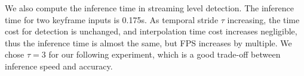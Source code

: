 \documentclass[a4paper, 10pt, conference]{ieeeconf}      %
\begin{document}
We also compute the inference time in streaming level detection. The inference time for two keyframe inputs is 0.175s. As temporal stride $\tau$ increasing, the time cost for detection is unchanged, and interpolation time cost increases negligible, thus the inference time is almost the same, but FPS increases by multiple. We chose $\tau = 3$ for our following experiment, which is a good trade-off between inference speed and accuracy.

\begin{table}
	\caption{Ablation study on KITTI Tracking test datasets.}
	\label{label:result_tracking}
\end{table}
\end{document}
